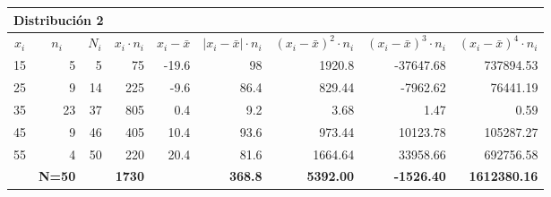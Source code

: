 \begin{table}[H]
\tiny
\centering
\begin{tabular}{rrrrrrrrr}
\multicolumn{8}{l}{\textbf{Distribución 2}} & \multicolumn{1}{l}{\textbf{}} \\ \hline
\multicolumn{1}{|c|}{\textbf{$x_i$}} & \multicolumn{1}{c|}{\textbf{$n_i$}} & \multicolumn{1}{c|}{\textbf{$N_i$}} & \multicolumn{1}{c|}{\textbf{$x_i \cdot n_i$}} & \multicolumn{1}{c|}{\textbf{$x_i-\bar x$}} & \multicolumn{1}{c|}{\textbf{$|x_i-\bar x|\cdot n_i$}} & \multicolumn{1}{c|}{\textbf{$(x_i-\bar x)^2\cdot n_i$}} & \multicolumn{1}{c|}{\textbf{$(x_i-\bar x)^3\cdot n_i$}} & \multicolumn{1}{c|}{\textbf{$(x_i-\bar x)^4\cdot n_i$}} \\ \hline
\multicolumn{1}{|r|}{15} & \multicolumn{1}{r|}{5} & \multicolumn{1}{r|}{5} & \multicolumn{1}{r|}{75} & \multicolumn{1}{r|}{-19.6} & \multicolumn{1}{r|}{98} & \multicolumn{1}{r|}{1920.8} & \multicolumn{1}{r|}{-37647.68} & \multicolumn{1}{r|}{737894.53} \\ \hline
\multicolumn{1}{|r|}{25} & \multicolumn{1}{r|}{9} & \multicolumn{1}{r|}{14} & \multicolumn{1}{r|}{225} & \multicolumn{1}{r|}{-9.6} & \multicolumn{1}{r|}{86.4} & \multicolumn{1}{r|}{829.44} & \multicolumn{1}{r|}{-7962.62} & \multicolumn{1}{r|}{76441.19} \\ \hline
\multicolumn{1}{|r|}{35} & \multicolumn{1}{r|}{23} & \multicolumn{1}{r|}{37} & \multicolumn{1}{r|}{805} & \multicolumn{1}{r|}{0.4} & \multicolumn{1}{r|}{9.2} & \multicolumn{1}{r|}{3.68} & \multicolumn{1}{r|}{1.47} & \multicolumn{1}{r|}{0.59} \\ \hline
\multicolumn{1}{|r|}{45} & \multicolumn{1}{r|}{9} & \multicolumn{1}{r|}{46} & \multicolumn{1}{r|}{405} & \multicolumn{1}{r|}{10.4} & \multicolumn{1}{r|}{93.6} & \multicolumn{1}{r|}{973.44} & \multicolumn{1}{r|}{10123.78} & \multicolumn{1}{r|}{105287.27} \\ \hline
\multicolumn{1}{|r|}{55} & \multicolumn{1}{r|}{4} & \multicolumn{1}{r|}{50} & \multicolumn{1}{r|}{220} & \multicolumn{1}{r|}{20.4} & \multicolumn{1}{r|}{81.6} & \multicolumn{1}{r|}{1664.64} & \multicolumn{1}{r|}{33958.66} & \multicolumn{1}{r|}{692756.58} \\ \hline
\multicolumn{1}{r|}{\textbf{}} & \multicolumn{1}{r|}{\textbf{N=50}} & \multicolumn{1}{r|}{\textbf{}} & \multicolumn{1}{r|}{\textbf{1730}} & \multicolumn{1}{r|}{\textbf{}} & \multicolumn{1}{r|}{\textbf{368.8}} & \multicolumn{1}{r|}{\textbf{5392.00}} & \multicolumn{1}{r|}{\textbf{-1526.40}} & \multicolumn{1}{r|}{\textbf{1612380.16}} \\ \cline{2-2} \cline{4-4} \cline{6-9} 
\end{tabular}
\end{table}

